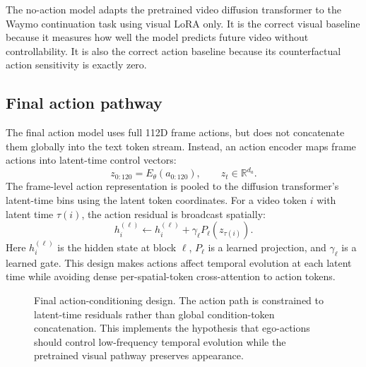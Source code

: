 \documentclass[10pt,twocolumn,letterpaper]{article}
\begin{document}
The no-action model adapts the pretrained video diffusion transformer to the Waymo continuation task using visual LoRA only. It is the correct visual baseline because it measures how well the model predicts future video without controllability. It is also the correct action baseline because its counterfactual action sensitivity is exactly zero.

\subsection{Final action pathway}

The final action model uses full 112D frame actions, but does not concatenate them globally into the text token stream. Instead, an action encoder maps frame actions into latent-time control vectors:
\begin{equation}
z_{0:120}=E_{\theta}(a_{0:120}),\qquad z_t\in\mathbb{R}^{d_a}.
\end{equation}
The frame-level action representation is pooled to the diffusion transformer's latent-time bins using the latent token coordinates. For a video token $i$ with latent time $\tau(i)$, the action residual is broadcast spatially:
\begin{equation}
h_i^{(\ell)} \leftarrow h_i^{(\ell)} + \gamma_{\ell}P_{\ell}(z_{\tau(i)}).
\end{equation}
Here $h_i^{(\ell)}$ is the hidden state at block $\ell$, $P_{\ell}$ is a learned projection, and $\gamma_{\ell}$ is a learned gate. This design makes actions affect temporal evolution at each latent time while avoiding dense per-spatial-token cross-attention to action tokens.

\begin{figure}[t]
\centering
{}
\caption{Final action-conditioning design. The action path is constrained to latent-time residuals rather than global condition-token concatenation. This implements the hypothesis that ego-actions should control low-frequency temporal evolution while the pretrained visual pathway preserves appearance.}
\label{fig:method}
\end{figure}
\end{document}
